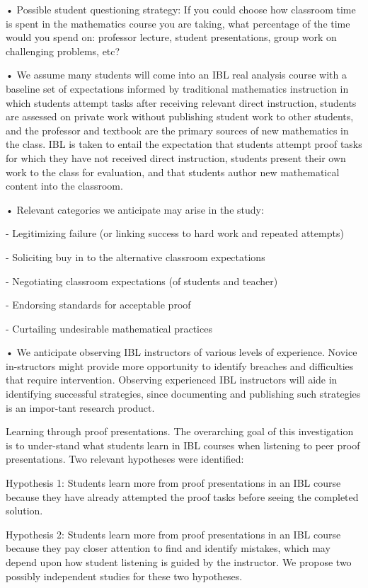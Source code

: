 \documentclass[11pt]{article}
\begin{document}
• Possible student questioning strategy: If you could choose how classroom time is spent in the mathematics course you are taking, what percentage of the time would you spend on: professor lecture, student presentations, group work on challenging problems, etc?

• We assume many students will come into an IBL real analysis course with a baseline set of expectations informed by traditional mathematics instruction in which students attempt tasks after receiving relevant direct instruction, students are assessed on private work without publishing student work to other students, and the professor and textbook are the primary sources of new mathematics in the class. IBL is taken to entail the expectation that students attempt proof tasks for which they have not received direct instruction, students present their own work to the class for evaluation, and that students author new mathematical content into the classroom.

• Relevant categories we anticipate may arise in the study:

- Legitimizing failure (or linking success to hard work and repeated attempts)

- Soliciting buy in to the alternative classroom expectations

- Negotiating classroom expectations (of students and teacher)

- Endorsing standards for acceptable proof

- Curtailing undesirable mathematical practices

• We anticipate observing IBL instructors of various levels of experience. Novice in-structors might provide more opportunity to identify breaches and difficulties that require intervention. Observing experienced IBL instructors will aide in identifying successful strategies, since documenting and publishing such strategies is an impor-tant research product.

Learning through proof presentations. The overarching goal of this investigation is to under-stand what students learn in IBL courses when listening to peer proof presentations. Two relevant hypotheses were identified:

Hypothesis 1: Students learn more from proof presentations in an IBL course because they have already attempted the proof tasks before seeing the completed solution.

Hypothesis 2: Students learn more from proof presentations in an IBL course because they pay closer attention to find and identify mistakes, which may depend upon how student listening is guided by the instructor. We propose two possibly independent studies for these two hypotheses.
\end{document}
